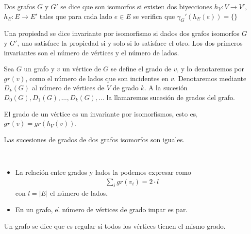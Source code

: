 \begin{definicion}
    Dos grafos $G$ y $G'$ se dice que son isomorfos si existen dos biyecciones $h_V:V\to V'$, $h_E: E \to E'$ tales que para cada lado $e\in E$ se verifica que $\gamma_G'(h_E(e)) = \{\}$
\end{definicion}

\begin{definicion}
    Una propiedad se dice invariante por isomorfismo si dados dos grafos isomorfos $G$ y $G'$, uno satisface la propiedad si y solo si lo satisface el otro. Los dos primeros invariantes son el número de vértices y el número de lados.
\end{definicion}

\begin{definicion}
    Sea $G$ un grafo y $v$ un vértice de $G$ se define el grado de $v$, y lo denotaremos por $gr(v)$, como el número de lados que son incidentes en $v$. Denotaremos mediante $D_k(G)$ al número de vértices de $V$ de grado $k$. A la sucesión $D_0(G), D_1(G),\dots,D_k(G),\dots$ la llamaremos sucesión de grados del grafo.
\end{definicion}

\begin{observacion}
    El grado de un vértice es un invariante por isomorfismos, esto es, $gr(v)=gr(h_V(v))$.
\end{observacion}

\begin{observacion}
    Las sucesiones de grados de dos grafos isomorfos son iguales.
\end{observacion}

\begin{propiedades}\
    \begin{itemize}
        \item La relación entre grados y lados la podemos expresar como
        \begin{align*}
            \sum\limits_i gr(v_i) = 2 \cdot l
        \end{align*}
        con $l=|E|$ el número de lados.
    
        \item En un grafo, el número de vértices de grado impar es par.
    \end{itemize}
\end{propiedades}

\begin{definicion}
    Un grafo se dice que es regular si todos los vértices tienen el mismo grado.
\end{definicion}

